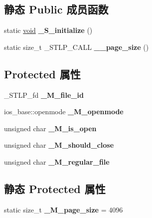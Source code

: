 \subsection*{静态 Public 成员函数}
\begin{DoxyCompactItemize}
\item 
\mbox{\label{class___filebuf__base_a845ae3ffbce3218b8d11bc8dc6f38e86}} 
static \hyperlink{interfacevoid}{void} {\bfseries \+\_\+\+S\+\_\+initialize} ()
\item 
\mbox{\label{class___filebuf__base_abdfeca96427193b796a52d890bac2225}} 
static size\+\_\+t \+\_\+\+S\+T\+L\+P\+\_\+\+C\+A\+LL {\bfseries \+\_\+\+\_\+page\+\_\+size} ()
\end{DoxyCompactItemize}
\subsection*{Protected 属性}
\begin{DoxyCompactItemize}
\item 
\mbox{\label{class___filebuf__base_a64da2434f4348c0a318c885bc0d2953c}} 
\+\_\+\+S\+T\+L\+P\+\_\+fd {\bfseries \+\_\+\+M\+\_\+file\+\_\+id}
\item 
\mbox{\label{class___filebuf__base_a4837bcd7d895a8cd8deaf5f0db883630}} 
ios\+\_\+base\+::openmode {\bfseries \+\_\+\+M\+\_\+openmode}
\item 
\mbox{\label{class___filebuf__base_a77c62ea3903ff32b4be73bde5d4524d0}} 
unsigned char {\bfseries \+\_\+\+M\+\_\+is\+\_\+open}
\item 
\mbox{\label{class___filebuf__base_a84dea510c1ddbd2ca5e29d6806024e68}} 
unsigned char {\bfseries \+\_\+\+M\+\_\+should\+\_\+close}
\item 
\mbox{\label{class___filebuf__base_a54d297829e71c0c80ddd6720330ee9e7}} 
unsigned char {\bfseries \+\_\+\+M\+\_\+regular\+\_\+file}
\end{DoxyCompactItemize}
\subsection*{静态 Protected 属性}
\begin{DoxyCompactItemize}
\item 
\mbox{\label{class___filebuf__base_a68f5dd445a770fabc2d7c9920d00476b}} 
static size\+\_\+t {\bfseries \+\_\+\+M\+\_\+page\+\_\+size} = 4096
\end{DoxyCompactItemize}



